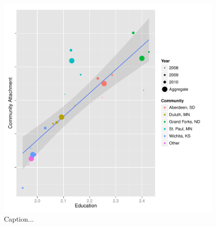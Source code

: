 \documentclass[11pt]{article}\usepackage{knitr}
\begin{document}
\begin{knitrout}
\color{fgcolor}\begin{figure}[H]

\includegraphics[width=\maxwidth]{figure/gp_two} \caption[Caption]{Caption...\label{fig:gp_two}}
\end{figure}


\end{knitrout}
\end{document}
